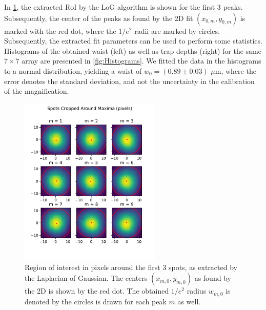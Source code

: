 In \cref{fig:SpotsRoI}, the extracted \ac{RoI} by the \ac{LoG} algorithm is shown for the first 3 peaks. 
Subsequently, the center of the peaks as found by the 2D fit $(x_{0,m},y_{0,m})$ is marked with the red dot, where the $1/e^2$ radii are marked by circles. 
Subsequently, the extracted fit parameters can be used to perform some statistics.
Histograms of the obtained waist (left) as well as trap depths (right) for the same $7\times7$ array are presented in \cref{fig:Histograms}.
We fitted the data in the histograms to a normal distribution, yielding a waist of $w_0 = (0.89 \pm 0.03)$ $\mu$m, where the error denotes the standard deviation, and not the uncertainty in the calibration of the magnification. 

\begin{figure}
    \centering
    \includegraphics[width=0.6\textwidth]{figures/SpotsCropped_range12.pdf}
    \caption{Region of interest in pixels around the first 3 spots, as extracted by the Laplacian of Gaussian. 
    The centers $(x_{m,0},y_{m,0})$ as found by the 2D is shown by the red dot. 
    The obtained $1/e^2$ radius $w_{m,0}$ is denoted by the circles is drawn for each peak $m$ as well.}
    \label{fig:SpotsRoI}
\end{figure}

